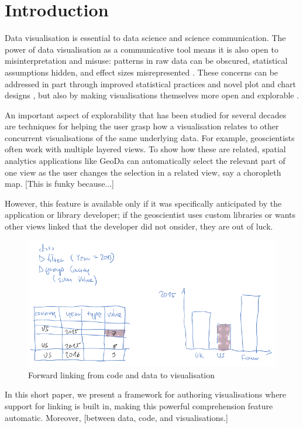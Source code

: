 \section{Introduction}

Data visualisation is essential to data science and science communication. The
power of data visualisation as a communicative tool means it is also open to
misinterpretation and misuse: patterns in raw data can be obscured, statistical
assumptions hidden, and effect sizes misrepresented \cite{weissgerber15}. These
concerns can be addressed in part through improved statistical practices and
novel plot and chart designs \cite{allen19}, but also by making visualisations
themselves more open and explorable \cite{dragicevic19}.

An important aspect of explorability that has been studied for several decades
are techniques for helping the user grasp how a visualisation relates to other
concurrent visualisations of the same underlying data. For example,
geoscientists often work with multiple layered views. To show how these are
related, spatial analytics applications like GeoDa \cite{anselin06} can
automatically select the relevant part of one view as the user changes the
selection in a related view, say a choropleth map. [This is funky because...]

However, this feature is available only if it was specifically anticipated by
the application or library developer; if the geoscientist uses custom libraries
or wants other views linked that the developer did not onsider, they are out of
luck.

\begin{figure}[H]
\includegraphics[scale=0.35]{image/chart-fwd}
\caption{Forward linking from code and data to visualisation}
\end{figure}

In this short paper, we present a framework for authoring visualisations where
support for linking is built in, making this powerful comprehension feature
automatic. Moreover, [between data, code, and visualisations.]

\cite{becker87,buja91}
